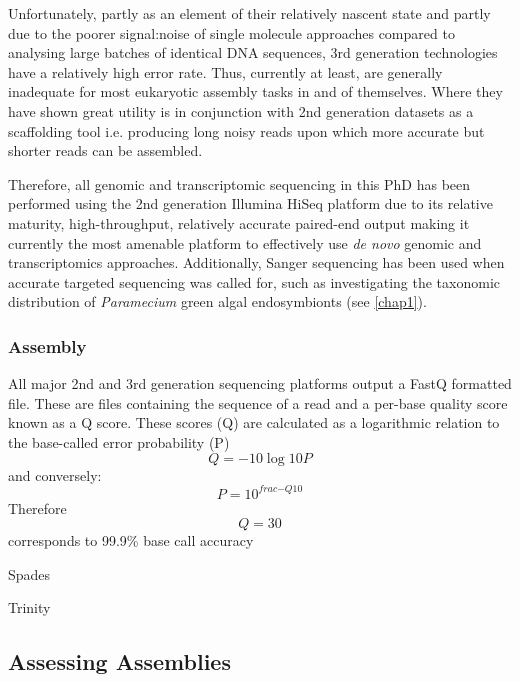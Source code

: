 
Unfortunately, partly as an element of their relatively nascent state and partly due to the
poorer signal:noise of single molecule approaches compared to analysing large 
batches of identical DNA sequences, 3rd generation technologies have a relatively high error rate.
Thus, currently at least, are generally inadequate for most eukaryotic assembly tasks in and of themselves.
Where they have shown great utility is in conjunction with 2nd generation datasets
as a scaffolding tool i.e. producing long noisy reads upon which more accurate but shorter
reads can be assembled.


Therefore, all genomic and transcriptomic sequencing in this PhD has been performed using the 2nd generation
Illumina HiSeq platform due to its relative maturity, high-throughput, relatively accurate
paired-end output making it currently the most amenable platform to effectively
use \textit{de novo} genomic and transcriptomics approaches.  Additionally, Sanger sequencing
has been used when accurate targeted sequencing was called for, such as investigating the
taxonomic distribution of \textit{Paramecium} green algal endosymbionts (see \ref{chap1}).


\subsubsection{Assembly}

All major 2nd and 3rd generation sequencing platforms output a FastQ formatted file.
These are files containing the sequence of a read and a per-base quality score known as a Q score.
These scores (Q) are calculated as a logarithmic relation to the base-called error probability (P)
\[ Q = -10\log{10}{P} \]
and conversely: 
\[ P = 10^{frac{-Q}{10}} \]
Therefore \[Q = 30 \] corresponds to 99.9\% base call accuracy




Spades \citep{Bankevich2012}

Trinity \citep{Grabherr2011}


\subsection{Assessing Assemblies}

